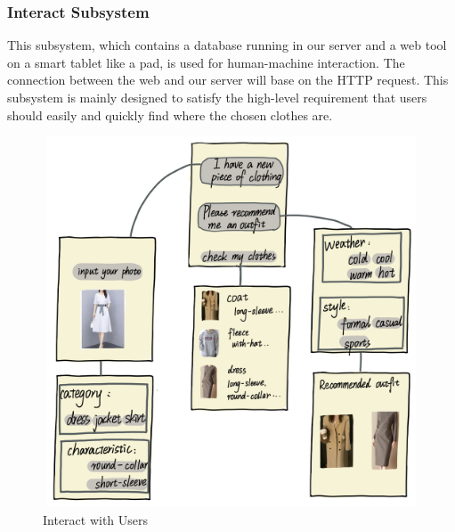 \subsubsection{Interact Subsystem}
This subsystem, which contains a database running in our server and a web tool on a smart tablet like a pad, is used for human-machine interaction. The connection between the web and our server will base on the HTTP request. This subsystem is mainly designed to satisfy the high-level requirement that users should easily and quickly find where the chosen clothes are. 
\begin{figure}[h]
   \centering
   \includegraphics[width=14cm,height=11cm]{graph/Interface with users.jpeg}
   \caption{Interact with Users}
   \label{interact function}
   \end{figure}

